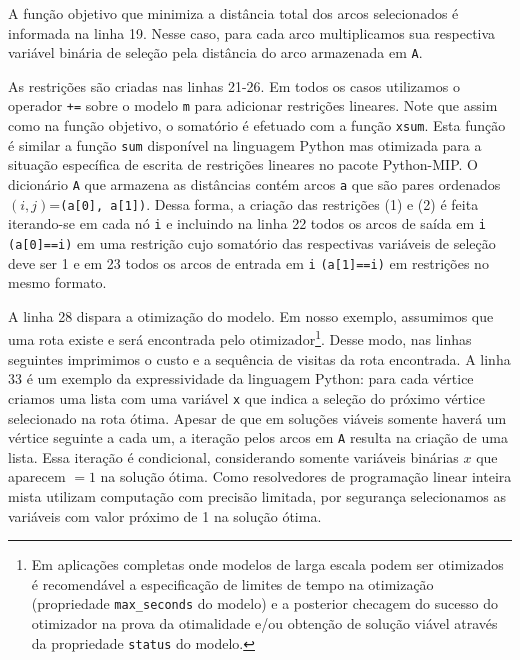 \documentclass[a4paper,11pt,fleqn]{article}
\begin{document}
A função objetivo que minimiza a distância total dos arcos selecionados é informada na linha 19. Nesse caso, para cada arco multiplicamos sua respectiva variável binária de seleção pela distância do arco armazenada em \texttt{A}.

As restrições são criadas nas linhas 21-26. Em todos os casos utilizamos o operador \texttt{+=} sobre o modelo \texttt{m} para adicionar restrições lineares. Note que assim como na função objetivo, o somatório é efetuado com a função \texttt{xsum}. Esta função é similar a função \texttt{sum} disponível na linguagem Python mas otimizada para a situação específica de escrita de restrições lineares no pacote Python-MIP. O dicionário \texttt{A} que armazena as distâncias contém arcos \texttt{a} que são pares ordenados $(i,j)$=\texttt{(a[0], a[1])}. Dessa forma, a criação das restrições (1) e (2) é feita iterando-se em cada nó \texttt{i} e incluindo na linha 22 todos os arcos de saída em \texttt{i} \texttt{(a[0]==i)} em uma restrição cujo somatório das respectivas variáveis de seleção deve ser 1 e em 23 todos os arcos de entrada em \texttt{i} \texttt{(a[1]==i)} em restrições no mesmo formato.

A linha 28 dispara a otimização do modelo. Em nosso exemplo, assumimos que uma rota existe e será encontrada pelo otimizador\footnote{Em aplicações completas onde modelos de larga escala podem ser otimizados é recomendável a especificação de limites de tempo na otimização (propriedade \texttt{max\_seconds} do modelo) e a posterior checagem do sucesso do otimizador na prova da otimalidade e/ou obtenção de solução viável através da propriedade \texttt{status} do modelo.}. Desse modo, nas linhas seguintes imprimimos o custo e a sequência de visitas da rota encontrada. A linha 33 é um exemplo da expressividade da linguagem Python: para cada vértice criamos uma lista com uma variável \texttt{x} que indica a seleção do próximo vértice selecionado na rota ótima. Apesar de que em soluções viáveis somente haverá um vértice seguinte a cada um, a iteração pelos arcos em \texttt{A} resulta na criação de uma lista. Essa iteração é condicional, considerando somente variáveis binárias $x$ que aparecem $=1$ na solução ótima. Como resolvedores de programação linear inteira mista utilizam computação com precisão limitada, por segurança selecionamos as variáveis com valor próximo de 1 na solução ótima.

		


\end{document}
